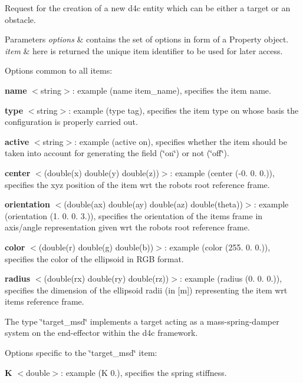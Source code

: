 Request for the creation of a new d4c entity which can be either a target or an obstacle. 


\begin{DoxyParams}{Parameters}
{\em options} & contains the set of options in form of a Property object. \\
\hline
{\em item} & here is returned the unique item identifier to be used for later access.\\
\hline
\end{DoxyParams}
Options common to all items\+:

{\bfseries name} $<$string$>$\+: example (name item\+\_\+name), specifies the item name.

{\bfseries type} $<$string$>$\+: example (type tag), specifies the item type on whose basis the configuration is properly carried out.

{\bfseries active} $<$string$>$\+: example (active on), specifies whether the item should be taken into account for generating the field (\char`\"{}on\char`\"{}) or not (\char`\"{}off\char`\"{}).

{\bfseries center} $<$(double(x) double(y) double(z))$>$\+: example (center (-\/0. 0. 0.)), specifies the xyz position of the item wrt the robot\textquotesingle{}s root reference frame.

{\bfseries orientation} $<$(double(ax) double(ay) double(az) double(theta))$>$\+: example (orientation (1. 0. 0. 3.)), specifies the orientation of the item\textquotesingle{}s frame in axis/angle representation given wrt the robot\textquotesingle{}s root reference frame.

{\bfseries color} $<$(double(r) double(g) double(b))$>$\+: example (color (255. 0. 0.)), specifies the color of the ellipsoid in R\+G\+B format.

{\bfseries radius} $<$(double(rx) double(ry) double(rz))$>$\+: example (radius (0. 0. 0.)), specifies the dimension of the ellipsoid radii (in \mbox{[}m\mbox{]}) representing the item wrt item\textquotesingle{}s reference frame.

The type \char`\"{}target\+\_\+msd\char`\"{} implements a target acting as a mass-\/spring-\/damper system on the end-\/effector within the d4c framework.

Options specific to the \char`\"{}target\+\_\+msd\char`\"{} item\+:

{\bfseries K} $<$double$>$\+: example (K 0.), specifies the spring stiffness.

